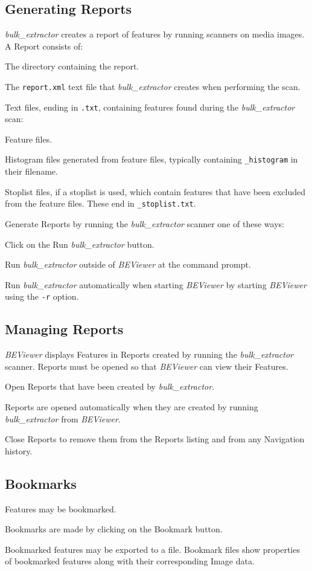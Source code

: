 \documentclass[10pt,twoside]{article}
\newcommand{\bulk}{\emph{bulk\_extractor}\xspace}
\newcommand{\bev}{\emph{BEViewer}\xspace}
\begin{document}
\subsection{Generating Reports}
\bulk creates a report of features by running scanners on media images.
A Report consists of:
\begin{compactitem}
\item The directory containing the report.
\item The \texttt{report.xml} text file that \bulk creates when performing the scan.
\item Text files, ending in \texttt{.txt}, containing features found during the \bulk scan:
\begin{compactitem}
\item Feature files.
\item Histogram files generated from feature files,
typically containing \texttt{\_histogram} in their filename.
\item Stoplist files, if a stoplist is used,
which contain features that have been excluded from the feature files.
These end in \texttt{\_stoplist.txt}.
\end{compactitem}
\end{compactitem}
Generate Reports by running the \bulk scanner one of these ways:
\begin{compactitem}
\item Click on the Run \bulk button.
\item Run \bulk outside of \bev at the command prompt.
\item Run \bulk automatically when starting \bev by starting \bev using the \texttt{-r} option.
\end{compactitem}
\subsection{Managing Reports}
\bev displays Features in Reports created by running the \bulk scanner.
Reports must be opened so that \bev can view their Features.
\begin{compactitem}
\item Open Reports that have been created by \bulk.
\item Reports are opened automatically when they are created by running \bulk from \bev.
\item Close Reports to remove them from the Reports listing and from any Navigation history.
\end{compactitem}
\subsection{Bookmarks}
Features may be bookmarked.
\begin{compactitem}
\item Bookmarks are made by clicking on the Bookmark button.
\item Bookmarked features may be exported to a file.
Bookmark files show properties of bookmarked features along with their corresponding Image data.
\end{compactitem}
\end{document}
